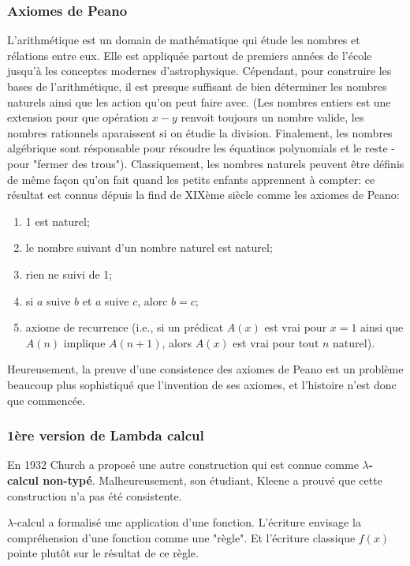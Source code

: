 \documentclass[12pt, a4paper]{article}
\begin{document}
\subsubsection*{Axiomes de Peano}
L'arithmétique est un domain de mathématique qui étude les nombres et rélations entre eux.
Elle est appliquée partout de premiers années de l'école jusqu'à les conceptes modernes d'astrophysique.
Cépendant, pour construire les bases de l'arithmétique, il est presque suffisant de bien déterminer les nombres naturels ainsi que les action qu'on peut faire avec.
(Les nombres entiers est une extension pour que opération $x - y$ renvoit toujours un nombre valide, les nombres rationnels aparaissent si on étudie la division. Finalement, les nombres algébrique sont résponsable pour résoudre les équatinos polynomials et le reste - pour "fermer des trous").
Classiquement, les nombres naturels peuvent être définis de même façon qu'on fait quand les petits enfants apprennent à compter: ce résultat est connus dépuis la find de XIXème siècle comme les axiomes de Peano:
\begin{enumerate}
	\item 1 est naturel;
	\item le nombre suivant d'un nombre naturel est naturel;
	\item rien ne suivi de 1;
	\item si $a$ suive $b$ et $a$ suive $c$, alorc $b=c$;
	\item axiome de recurrence (i.e., si un prédicat $A(x)$ est vrai pour $x=1$ ainsi que $A(n)$ implique $A(n+1)$, alors $A(x)$ est vrai pour tout $n$ naturel).
\end{enumerate}
Heureusement, la preuve d'une consistence des axiomes de Peano est un problème beaucoup plus sophistiqué que l'invention de ses axiomes, et l'histoire n'est donc que commencée.

\subsubsection*{1ère version de Lambda calcul}
En 1932 Church a proposé une autre construction qui est connue comme \textbf{$\lambda$-calcul non-typé}.
Malheureusement, son étudiant, Kleene a prouvé que cette construction n'a pas été consistente.

$\lambda$-calcul a formalisé une application d'une fonction. L'écriture envisage la compréhension d'une fonction comme une "règle". Et l'écriture classique $f(x)$ pointe plutôt sur le résultat de ce règle.
\end{document}
